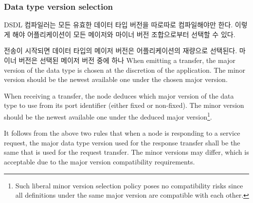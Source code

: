 \subsubsection{Data type version selection}

DSDL 컴파일러는 모든 유효한 데이터 타입 버전을 따로따로 컴파일해야만 한다.
이렇게 해야 어플리케이션이 모든 메이저와 마이너 버전 조합으로부터 선택할 수 있다.

전송이 시작되면 데이터 타입의 메이저 버전은 어플리케이션의 재량으로 선택된다.
마이너 버전은 선택된 메이저 버전 중에 하나
When emitting a transfer, the major version of the data type is chosen at the discretion of the application.
The minor version should be the newest available one under the chosen major version.

When receiving a transfer, the node deduces which major version of the data type to use
from its port identifier (either fixed or non-fixed).
The minor version should be the newest available one under the deduced major version\footnote{%
    Such liberal minor version selection policy poses no compatibility risks since all definitions under the same
    major version are compatible with each other.
}.

It follows from the above two rules that when a node is responding to a service request,
the major data type version used for the response transfer shall be the same that is used for the request transfer.
The minor versions may differ, which is acceptable due to the major version compatibility requirements.

